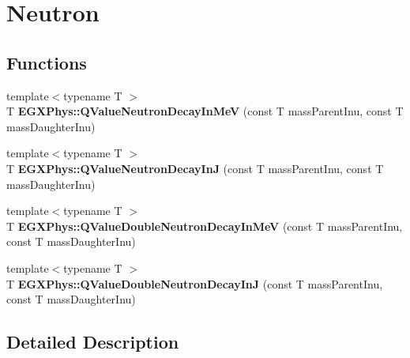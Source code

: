 \hypertarget{group___e_g_x_phys-_q_value-_neutron}{}\section{Neutron}
\label{group___e_g_x_phys-_q_value-_neutron}
\subsection*{Functions}
\begin{DoxyCompactItemize}
\item 
\mbox{\label{group___e_g_x_phys-_q_value-_neutron_ga620a6b6be2d0eb619e74244499daebf1}} 
{\footnotesize template$<$typename T $>$ }\\T {\bfseries E\+G\+X\+Phys\+::\+Q\+Value\+Neutron\+Decay\+In\+MeV} (const T mass\+Parent\+Inu, const T mass\+Daughter\+Inu)
\item 
\mbox{\label{group___e_g_x_phys-_q_value-_neutron_ga937f18fb2702de93bba879e574df61ec}} 
{\footnotesize template$<$typename T $>$ }\\T {\bfseries E\+G\+X\+Phys\+::\+Q\+Value\+Neutron\+Decay\+InJ} (const T mass\+Parent\+Inu, const T mass\+Daughter\+Inu)
\item 
\mbox{\label{group___e_g_x_phys-_q_value-_neutron_gabf2475452fd7ae9406a24e7600c67dda}} 
{\footnotesize template$<$typename T $>$ }\\T {\bfseries E\+G\+X\+Phys\+::\+Q\+Value\+Double\+Neutron\+Decay\+In\+MeV} (const T mass\+Parent\+Inu, const T mass\+Daughter\+Inu)
\item 
\mbox{\label{group___e_g_x_phys-_q_value-_neutron_gac78fc62a11e704966d972517f8e4f38e}} 
{\footnotesize template$<$typename T $>$ }\\T {\bfseries E\+G\+X\+Phys\+::\+Q\+Value\+Double\+Neutron\+Decay\+InJ} (const T mass\+Parent\+Inu, const T mass\+Daughter\+Inu)
\end{DoxyCompactItemize}


\subsection{Detailed Description}

